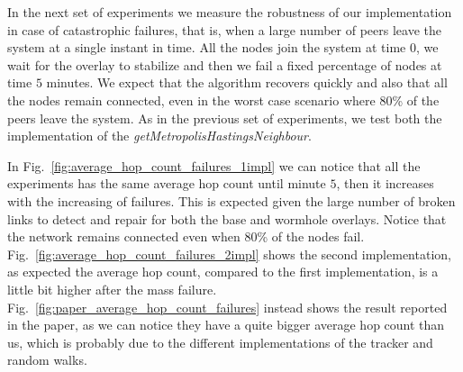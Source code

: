 \newpage
In the next set of experiments we measure the robustness of our implementation in case of catastrophic failures, that is, when a large number of peers leave the system at a single instant in time. All the nodes join the system at time $0$, we wait for the overlay to stabilize and then we fail a fixed percentage of nodes at time $5$ minutes. We expect that the algorithm recovers quickly and also that all the nodes remain connected, even in the worst case scenario where 80\% of the peers leave the system. As in the previous set of experiments, we test both the implementation of the \textit{getMetropolisHastingsNeighbour}.

In Fig.~\ref{fig:average_hop_count_failures_1impl} we can notice that all the experiments has the same average hop count until minute $5$, then it increases with the increasing of failures. This is expected given the large number of broken links to detect and repair for both the base and wormhole overlays. Notice that the network remains connected even when 80\% of the nodes fail. Fig.~\ref{fig:average_hop_count_failures_2impl} shows the second implementation, as expected the average hop count, compared to the first implementation, is a little bit higher after the mass failure. Fig.~\ref{fig:paper_average_hop_count_failures} instead shows the result reported in the paper, as we can notice they have a quite bigger average hop count than us, which is probably due to the different implementations of the tracker and random walks.

